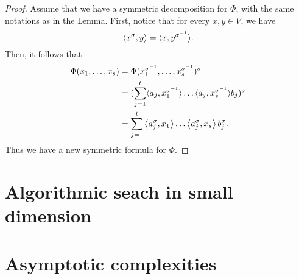 \begin{proof}
 Assume that we have a symmetric decomposition for $\Phi$, with the same
 notations as in the Lemma. First, notice that for every $x,y\in V$, we have
 \[
   \left\langle x^\sigma,y\right\rangle = \langle{x},{y^{\sigma^{-1}}}\rangle.
 \]
 Then, it follows that
 \begin{align*}
   \Phi(x_1, \dots, x_s) &= \Phi(x_1^{\sigma^{-1}}, \dots,
   x_{s}^{\sigma^{-1}})^\sigma\\
   &=
   (\sum_{j=1}^t\langle{a_j},{x_1^{\sigma^{-1}}}\rangle\dots\langle{a_j},{x_s^{\sigma^{-1}}}\rangle
   b_j)^\sigma\\
   &= \sum_{j=1}^t\left\langle a_j^{\sigma},x_1\right\rangle\dots\left\langle a_j^\sigma,x_s\right\rangle b_j^\sigma.
 \end{align*}
 Thus we have a new symmetric formula for $\Phi$.
\end{proof}

\section{Algorithmic seach in small dimension}
\section{Asymptotic complexities}
